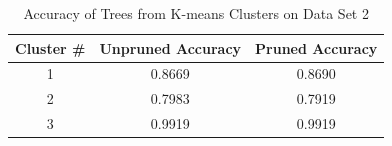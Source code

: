\documentclass[conference,compsoc]{IEEEtran}
\begin{document}
\begin{table}[!t]
\renewcommand{\arraystretch}{1.3}
\caption{Accuracy of Trees from K-means Clusters on Data Set 2}
\label{table.kmeans.accuracy.02}
\centering
\begin{tabular}{ccc}
\hline
Cluster \# & Unpruned Accuracy & Pruned Accuracy \\
\hline 
1 & 0.8669 & 0.8690 \\
2 & 0.7983 & 0.7919 \\
3 & 0.9919 & 0.9919 \\
\hline
\end{tabular}
\end{table}


%
%
%




\end{document}
